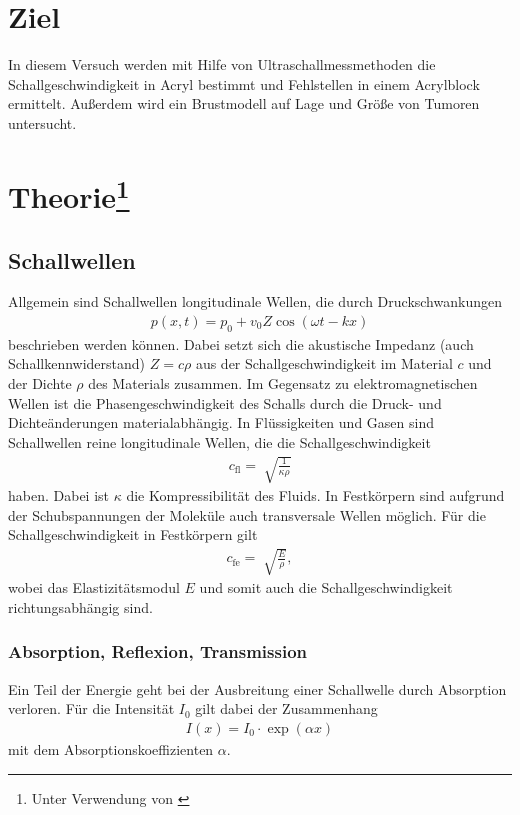 \section{Ziel}
In diesem Versuch werden mit Hilfe von Ultraschallmessmethoden die Schallgeschwindigkeit in Acryl bestimmt und Fehlstellen in einem Acrylblock ermittelt.
Außerdem wird ein Brustmodell auf Lage und Größe von Tumoren untersucht. 



\section[Theorie]{Theorie\footnote[1]{Unter Verwendung von \cite[]{man:us1}}}

\subsection{Schallwellen}
Allgemein sind Schallwellen longitudinale Wellen, die durch Druckschwankungen
\begin{align}
    p(x,t) = p_0 + v_0 Z \cos(\omega t - kx)
    \label{eq:welle}
\end{align}
beschrieben werden können.
Dabei setzt sich die akustische Impedanz (auch Schallkennwiderstand) $Z = c \rho$ aus der Schallgeschwindigkeit im Material $c$ und der Dichte $\rho$ des Materials zusammen.
Im Gegensatz zu elektromagnetischen Wellen ist die Phasengeschwindigkeit des Schalls durch die Druck- und Dichteänderungen materialabhängig.
In Flüssigkeiten und Gasen sind Schallwellen reine longitudinale Wellen, die die Schallgeschwindigkeit
\begin{align}
    c_\text{fl} = \sqrt[]{\frac{1}{\kappa \rho}}  
    \label{eq:c-fluid}
\end{align}
haben. 
Dabei ist $\kappa$ die Kompressibilität des Fluids.
In Festkörpern sind aufgrund der Schubspannungen der Moleküle auch transversale Wellen möglich.
Für die Schallgeschwindigkeit in Festkörpern gilt
\begin{align}
    c_\text{fe} = \sqrt[]{\frac{E}{\rho}},
    \label{eq:c-fest}
\end{align}
wobei das Elastizitätsmodul $E$ und somit auch die Schallgeschwindigkeit richtungsabhängig sind.



\subsubsection{Absorption, Reflexion, Transmission}
Ein Teil der Energie geht bei der Ausbreitung einer Schallwelle durch Absorption verloren.
Für die Intensität $I_0$ gilt dabei der Zusammenhang 
\begin{align}
    I(x) = I_0 \cdot \exp(\alpha x)
    \label{eq:absorption}
\end{align}
mit dem Absorptionskoeffizienten $\alpha$.

